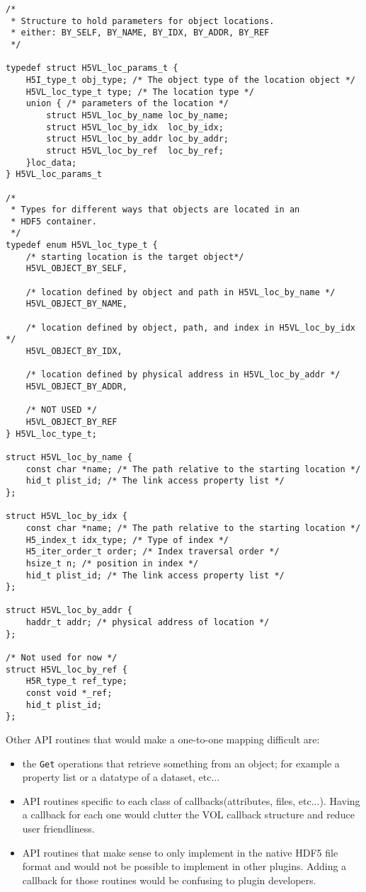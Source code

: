 \begin{lstlisting}
/* 
 * Structure to hold parameters for object locations.
 * either: BY_SELF, BY_NAME, BY_IDX, BY_ADDR, BY_REF 
 */

typedef struct H5VL_loc_params_t {
    H5I_type_t obj_type; /* The object type of the location object */
    H5VL_loc_type_t type; /* The location type */
    union { /* parameters of the location */
        struct H5VL_loc_by_name loc_by_name;
        struct H5VL_loc_by_idx  loc_by_idx;
        struct H5VL_loc_by_addr loc_by_addr;
        struct H5VL_loc_by_ref  loc_by_ref;
    }loc_data;
} H5VL_loc_params_t

/* 
 * Types for different ways that objects are located in an 
 * HDF5 container.
 */
typedef enum H5VL_loc_type_t {
    /* starting location is the target object*/
    H5VL_OBJECT_BY_SELF, 

    /* location defined by object and path in H5VL_loc_by_name */
    H5VL_OBJECT_BY_NAME, 

    /* location defined by object, path, and index in H5VL_loc_by_idx */
    H5VL_OBJECT_BY_IDX,

    /* location defined by physical address in H5VL_loc_by_addr */
    H5VL_OBJECT_BY_ADDR,

    /* NOT USED */
    H5VL_OBJECT_BY_REF
} H5VL_loc_type_t;

struct H5VL_loc_by_name {
    const char *name; /* The path relative to the starting location */
    hid_t plist_id; /* The link access property list */
};

struct H5VL_loc_by_idx {
    const char *name; /* The path relative to the starting location */
    H5_index_t idx_type; /* Type of index */
    H5_iter_order_t order; /* Index traversal order */
    hsize_t n; /* position in index */
    hid_t plist_id; /* The link access property list */
};

struct H5VL_loc_by_addr {
    haddr_t addr; /* physical address of location */
};

/* Not used for now */
struct H5VL_loc_by_ref {
    H5R_type_t ref_type;
    const void *_ref;
    hid_t plist_id;
};
\end{lstlisting}

Other API routines that would make a one-to-one mapping difficult are:
\begin{itemize} 
\item the {\tt Get} operations that retrieve something from an object; for example a property list or a datatype of a dataset, etc... 
\item API routines specific to each class of callbacks(attributes, files, etc...). Having a callback for each one would clutter the VOL callback structure and reduce user friendliness. 
\item API routines that make sense to only implement in the native HDF5 file format and would not be possible to implement in other plugins. Adding a callback for those routines would be confusing to plugin developers. 
\end{itemize}

